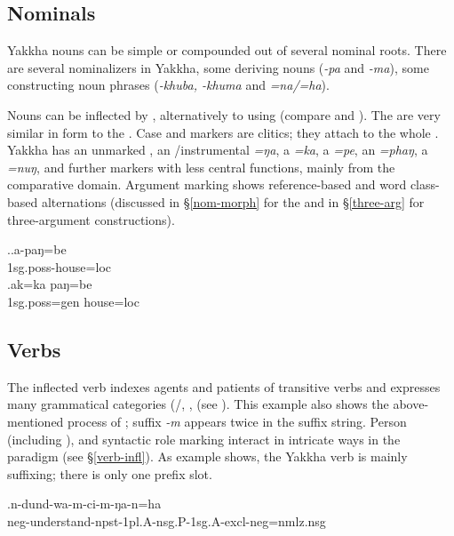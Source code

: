 \subsection{Nominals}

Yakkha nouns can be simple or compounded out of several nominal roots. There are several nominalizers in Yakkha, some deriving nouns (\emph{-pa} and \emph{-ma}), some constructing noun phrases (\emph{-khuba, -khuma} and \emph{=na/=ha}).

 Nouns can be inflected by , alternatively to using  (compare \Next[a] and \Next[b]). The  are very similar in form to the . Case and  markers are clitics; they attach to the whole . Yakkha has an unmarked , an /instrumental \emph{=ŋa}, a  \emph{=ka}, a  \emph{=pe}, an  \emph{=phaŋ}, a  \emph{=nuŋ}, and further markers with less central functions, mainly from the comparative domain. Argument marking shows reference-based and word class-based alternations (discussed in §\ref{nom-morph} for the   and in §\ref{three-arg} for three-argument constructions).

\ex.\ag.a-paŋ=be\\
{\sc 1sg.poss-}house{\sc =loc}\\
\bg.ak=ka paŋ=be\\
{\sc 1sg.poss=gen} house{\sc =loc}\\


\subsection{Verbs}

The inflected verb  indexes agents and patients of transitive verbs and expresses many grammatical categories (/, ,  (see \Next). This example also shows the above-mentioned process of ; suffix \emph{-m} appears twice in the suffix string. Person (including ),  and syntactic role marking interact in intricate ways in the  paradigm (see §\ref{verb-infl}). As example \Next shows, the Yakkha verb is mainly suffixing; there is only one prefix slot. 

\exg.n-dund-wa-m-ci-m-ŋa-n=ha\\
{\sc neg-}understand{\sc -npst-1pl.A-nsg.P-1sg.A-excl-neg=nmlz.nsg}\\



